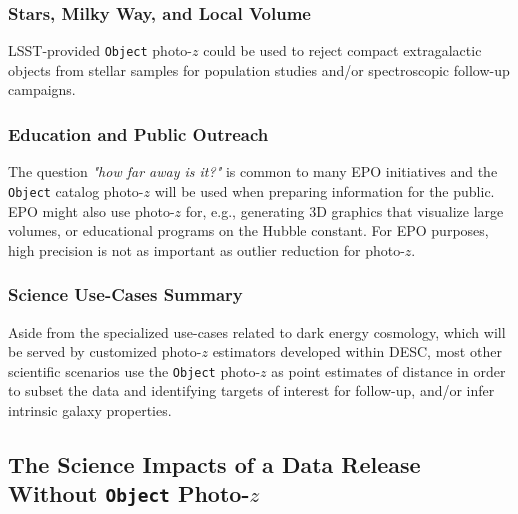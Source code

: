 \documentclass[DM,lsstdraft,toc]{lsstdoc}
\begin{document}
\subsubsection{Stars, Milky Way, and Local Volume}\label{sssec:use_sci_smwlv}
LSST-provided {\tt Object} photo-$z$ could be used to reject compact extragalactic objects from stellar samples for population studies and/or spectroscopic follow-up campaigns.

\subsubsection{Education and Public Outreach}\label{sssec:use_sci_epo}
The question {\it "how far away is it?"} is common to many EPO initiatives and the {\tt Object} catalog photo-$z$ will be used when preparing information for the public.
EPO might also use photo-$z$ for, e.g., generating 3D graphics that visualize large volumes, or educational programs on the Hubble constant.
For EPO purposes, high precision is not as important as outlier reduction for photo-$z$.


\subsubsection{Science Use-Cases Summary}\label{sssec:use_sci_sum}
Aside from the specialized use-cases related to dark energy cosmology, which will be served by customized photo-$z$ estimators developed within DESC, most other scientific scenarios use the {\tt Object} photo-$z$ as point estimates of distance in order to subset the data and identifying targets of interest for follow-up, and/or infer intrinsic galaxy properties.

\subsection{The Science Impacts of a Data Release Without {\tt Object} Photo-$z$}\label{ssec:use_none}
\end{document}
